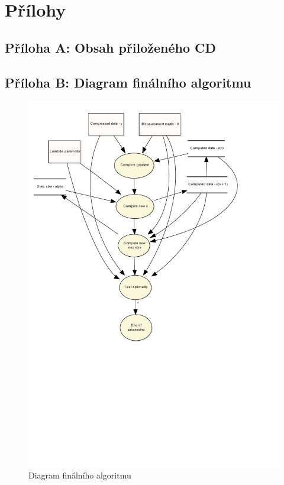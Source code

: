\documentclass[FM,BP]{tulthesis}
\begin{document}
\chapter*{Přílohy}
\captionsetup[figure]{list=no}
\begin{appendices}
	\section*{Příloha A: Obsah přiloženého CD}
	\label{appA}
	\newpage
	\section*{Příloha B: Diagram finálního algoritmu} \label{appB}
	\begin{figure}[!ht]
		\begin{center}
			\includegraphics[scale=0.8]{obr/finalAlg.pdf}
		\end{center}
		\caption{Diagram finálního algoritmu}
		\label{fig:finalAlg}
	\end{figure}
\end{appendices}
\end{document}
